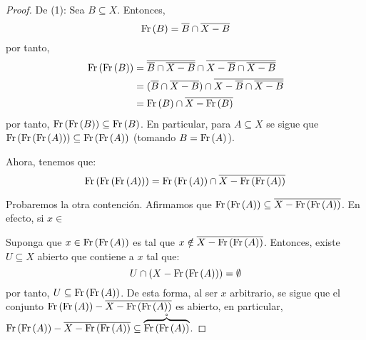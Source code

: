 \documentclass[12pt]{report}
\theoremstyle{largebreak}
\newcommand{\Int}[1]{\ensuremath{\mathring{#1}}}
\newcommand{\Cls}[1]{\ensuremath{\overline{#1}}}
\newcommand{\Fr}[1]{\ensuremath{\textup{Fr}\left(#1\right)}}
\begin{document}
    \begin{proof}
        De (1): Sea $B\subseteq X$. Entonces,
        \begin{equation*}
            \Fr{B}=\Cls{B}\cap\Cls{X-B}
        \end{equation*}
        por tanto,
        \begin{equation*}
            \begin{split}
                \Fr{\Fr{B}}&=\Cls{\Cls{B}\cap\Cls{X-B}}\cap\Cls{X-\Cls{B}\cap\Cls{X-B}}\\
                &=(\Cls{B}\cap\Cls{X-B})\cap\Cls{X-\Cls{B}\cap\Cls{X-B}}\\
                &=\Fr{B}\cap\Cls{X-\Fr{B}}\\
            \end{split}
        \end{equation*}
        por tanto, $\Fr{\Fr{B}}\subseteq \Fr{B}$. En particular, para $A\subseteq X$ se sigue que $\Fr{\Fr{\Fr{A}}}\subseteq\Fr{\Fr{A}}$ (tomando $B=\Fr{A}$).

        Ahora, tenemos que:
        \begin{equation*}
            \Fr{\Fr{\Fr{A}}}=\Fr{\Fr{A}}\cap\Cls{X-\Fr{\Fr{A}}}
        \end{equation*}

        Probaremos la otra contención. Afirmamos que $\Fr{\Fr{A}}\subseteq\Cls{X-\Fr{\Fr{A}}}$. En efecto, si $x\in $
        
        Suponga que $x\in\Fr{\Fr{A}}$ es tal que $x\notin\Cls{X-\Fr{\Fr{A}}}$. Entonces, existe $U\subseteq X$ abierto que contiene a $x$ tal que:
        \begin{equation*}
            U\cap(X-\Fr{\Fr{A}})=\emptyset
        \end{equation*}
        por tanto, $U\subseteq\Fr{\Fr{A}}$. De esta forma, al ser $x$ arbitrario, se sigue que el conjunto $\Fr{\Fr{A}}-\Cls{X-\Fr{\Fr{A}}}$ es abierto, en particular, $\Fr{\Fr{A}}-\Cls{X-\Fr{\Fr{A}}}\subseteq\Int{\overbrace{\Fr{\Fr{A}}}}$.


\end{proof}
\end{document}
